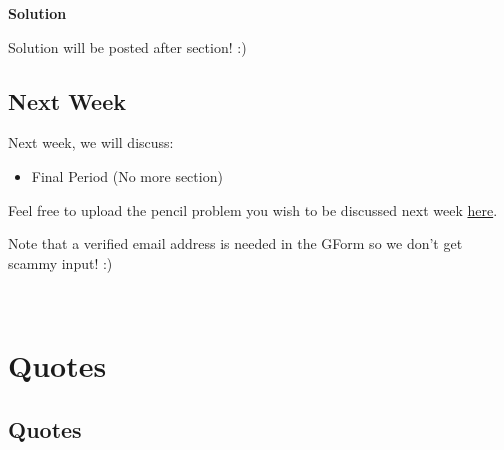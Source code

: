 \documentclass[
  letterpaper,
  DIV=11,
  numbers=noendperiod]{scrreprt}
\providecommand{\tightlist}{%
  \setlength{\itemsep}{0pt}\setlength{\parskip}{0pt}}\usepackage{longtable,booktabs,array}
\theoremstyle{definition}
\theoremstyle{plain}
\theoremstyle{remark}
\begin{document}
\begin{tcolorbox}[enhanced jigsaw, colback=white, leftrule=.75mm, breakable, toprule=.15mm, rightrule=.15mm, opacityback=0, left=2mm, bottomrule=.15mm, arc=.35mm, colframe=quarto-callout-tip-color-frame]
\begin{minipage}[t]{5.5mm}
\textcolor{quarto-callout-tip-color}{\faLightbulb}
\end{minipage}%
\begin{minipage}[t]{\textwidth - 5.5mm}

\textbf{Solution}\vspace{2mm}

Solution will be posted after section! :)

\end{minipage}%
\end{tcolorbox}

\hypertarget{next-week-8}{%
\section*{Next Week}\label{next-week-8}}


Next week, we will discuss:

\begin{itemize}
\tightlist
\item
  Final Period (No more section)
\end{itemize}

Feel free to upload the pencil problem you wish to be discussed next
week \href{https://forms.gle/RBmMNYJp4u3qD5W79}{here}.

Note that a verified email address is needed in the GForm so we don't
get scammy input! :)

\(\,\)


\hypertarget{quotes}{%
\chapter*{Quotes}\label{quotes}}


\hypertarget{quotes-1}{%
\section*{Quotes}\label{quotes-1}}
\end{document}

